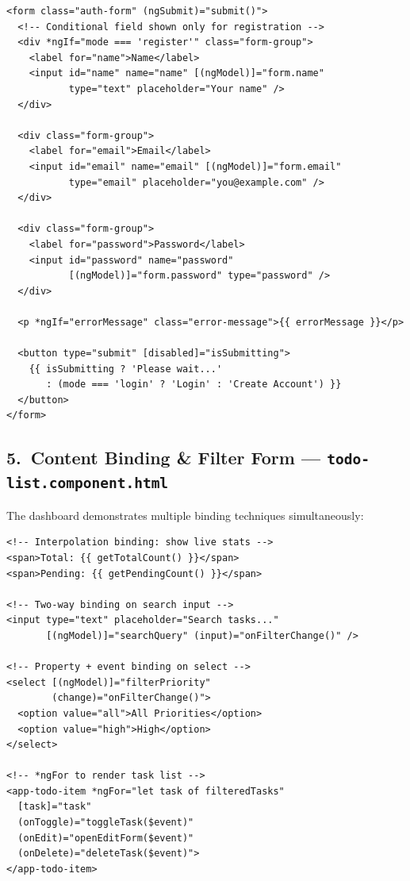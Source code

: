 \documentclass[11pt,a4paper]{article}
\begin{document}
\begin{lstlisting}[style=html]
<form class="auth-form" (ngSubmit)="submit()">
  <!-- Conditional field shown only for registration -->
  <div *ngIf="mode === 'register'" class="form-group">
    <label for="name">Name</label>
    <input id="name" name="name" [(ngModel)]="form.name"
           type="text" placeholder="Your name" />
  </div>

  <div class="form-group">
    <label for="email">Email</label>
    <input id="email" name="email" [(ngModel)]="form.email"
           type="email" placeholder="you@example.com" />
  </div>

  <div class="form-group">
    <label for="password">Password</label>
    <input id="password" name="password"
           [(ngModel)]="form.password" type="password" />
  </div>

  <p *ngIf="errorMessage" class="error-message">{{ errorMessage }}</p>

  <button type="submit" [disabled]="isSubmitting">
    {{ isSubmitting ? 'Please wait...'
       : (mode === 'login' ? 'Login' : 'Create Account') }}
  </button>
</form>
\end{lstlisting}

\subsection*{5.\ Content Binding \& Filter Form — \texttt{todo-list.component.html}}

The dashboard demonstrates multiple binding techniques simultaneously:

\begin{lstlisting}[style=html]
<!-- Interpolation binding: show live stats -->
<span>Total: {{ getTotalCount() }}</span>
<span>Pending: {{ getPendingCount() }}</span>

<!-- Two-way binding on search input -->
<input type="text" placeholder="Search tasks..."
       [(ngModel)]="searchQuery" (input)="onFilterChange()" />

<!-- Property + event binding on select -->
<select [(ngModel)]="filterPriority"
        (change)="onFilterChange()">
  <option value="all">All Priorities</option>
  <option value="high">High</option>
</select>

<!-- *ngFor to render task list -->
<app-todo-item *ngFor="let task of filteredTasks"
  [task]="task"
  (onToggle)="toggleTask($event)"
  (onEdit)="openEditForm($event)"
  (onDelete)="deleteTask($event)">
</app-todo-item>
\end{lstlisting}
\end{document}
